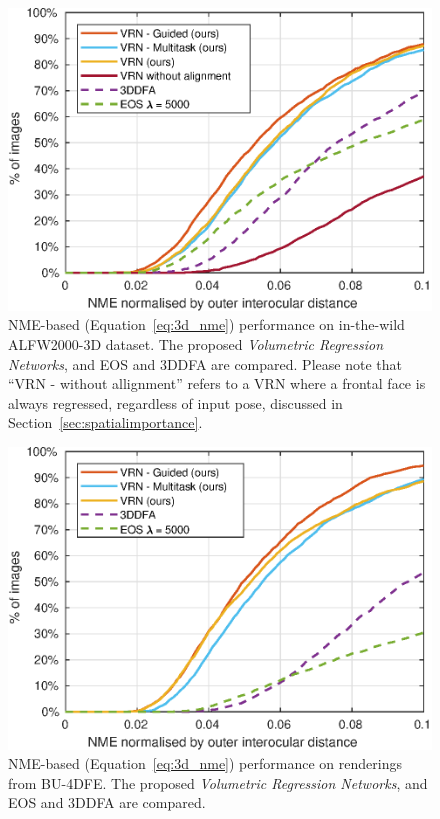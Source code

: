 \begin{figure}
  \centering
  \includegraphics[width=0.75\linewidth]{curves/aflw.eps}
  \caption[NME performance on AFLW2000-3D images]{NME-based
    (Equation~\ref{eq:3d_nme}) performance on in-the-wild ALFW2000-3D
    dataset. The proposed \textit{Volumetric Regression Networks}, and
    EOS and 3DDFA are compared. Please note that ``VRN - without
    allignment'' refers to a VRN where a frontal face is always
    regressed, regardless of input pose, discussed in
    Section~\ref{sec:spatialimportance}.}
  \label{roc:aflw2000}
\end{figure}

\begin{figure}
  \centering
  \includegraphics[width=0.75\linewidth]{curves/bu4dfe.eps}
  \caption[NME performance on BU-4DFE renderings]{NME-based
    (Equation~\ref{eq:3d_nme}) performance on renderings from
    BU-4DFE. The proposed \textit{Volumetric Regression Networks}, and
    EOS and 3DDFA are compared.}
  \label{roc:bu4dfe}
\end{figure}


